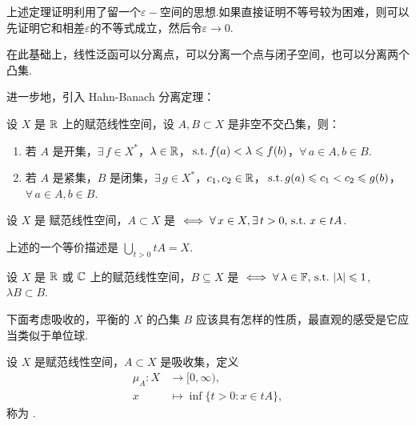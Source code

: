 上述定理证明利用了留一个$\varepsilon-\!\!$空间的思想.如果直接证明不等号较为困难，则可以先证明它和相差$\varepsilon$的不等式成立，然后令$\varepsilon\to 0$.\par
在此基础上，线性泛函可以分离点，可以分离一个点与闭子空间，也可以分离两个凸集.\par
进一步地，引入 Hahn-Banach 分离定理：

\begin{theorem}
    设 $X$ 是 $\mathbb{R}$ 上的赋范线性空间，设 $A, B \subset X$ 是非空不交凸集，则：
    \begin{enumerate}[label=(\arabic*),leftmargin=2em]
        \item 若 $A$ 是开集，$\exists\, f \in X^*$，$\lambda \in \mathbb{R}$，$\operatorname{\,\text{s.t.}} f(a) < \lambda \leqslant f(b)$，$\forall\, a \in A, b \in B$.
        \item 若 $A$ 是紧集，$B$ 是闭集，$\exists\, g \in X^*$，$c_1, c_2 \in \mathbb{R}$，$\operatorname{\,\text{s.t.}} g(a) \leqslant c_1 < c_2 \leqslant g(b)$，$\forall\, a \in A, b \in B$.
    \end{enumerate}
\end{theorem}

\begin{definition}[吸收集]
    设 $X$ 是 赋范线性空间，$A \subset X$ 是 $\iff \forall\, x \in X, \exists\, t > 0, \operatorname{\,\text{s.t.}}\, x \in tA$.
\end{definition}

上述的一个等价描述是 $\bigcup_{t > 0} tA = X$.

\begin{definition}[平衡集]
    设 $X$ 是 $\mathbb{R}$ 或 $\mathbb{C}$ 上的赋范线性空间，$B \subseteq X$ 是 $\iff \forall\, \lambda \in \mathbb{F}, \operatorname{\,\text{s.t.}}\, |\lambda| \leqslant 1$, $\lambda B \subset B$.
\end{definition}

下面考虑吸收的，平衡的 $X$ 的凸集 $B$ 应该具有怎样的性质，最直观的感受是它应当类似于单位球.

\begin{definition}[Minkowski 泛函]
    设 $X$ 是赋范线性空间，$A \subset X$ 是吸收集，定义 
    \begin{align*}
        \mu_A\colon X &\to [0, \infty),\\[-2pt]
        x &\mapsto \inf \{t > 0 : x \in tA\},
    \end{align*}
    称为 .
\end{definition}

